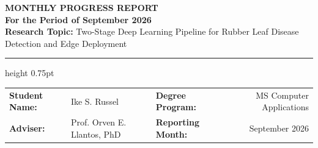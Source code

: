 \documentclass[10pt,a4paper]{article}
\begin{document}
\begin{center}
    {\Large\textbf{\textcolor{navyblue}{MONTHLY PROGRESS REPORT}}}\\[4pt]
    {\large\textbf{For the Period of September 2026}}\\[6pt]
    {\normalsize\textbf{Research Topic:} Two-Stage Deep Learning Pipeline for Rubber Leaf Disease Detection and Edge Deployment}
\end{center}

\vspace{0.2cm}
\hrule height 0.75pt
\vspace{0.35cm}

\noindent
\begin{tabularx}{\textwidth}{@{}l X l r@{}}
    \textbf{Student Name:} & Ike S. Russel & \textbf{Degree Program:} & MS Computer Applications \\
    \textbf{Adviser:} & Prof. Orven E. Llantos, PhD & \textbf{Reporting Month:} & September 2026 \\
\end{tabularx}

\vspace{0.4cm}
\end{document}
